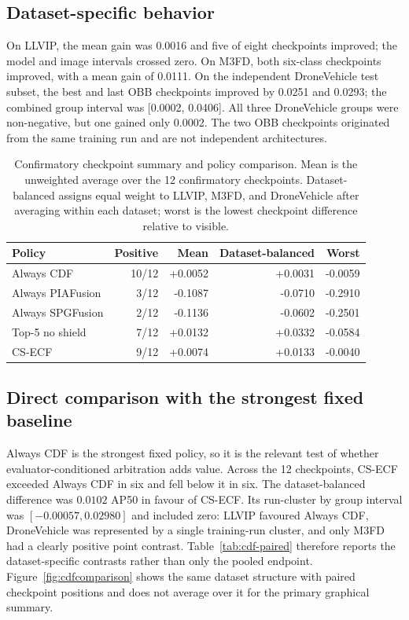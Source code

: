 \documentclass[preprint,11pt]{elsarticle}
\begin{document}
\subsection{Dataset-specific behavior}

On LLVIP, the mean gain was 0.0016 and five of eight checkpoints improved; the
model and image intervals crossed zero. On M3FD, both six-class checkpoints
improved, with a mean gain of 0.0111. On the independent DroneVehicle test
subset, the best and last OBB checkpoints improved by 0.0251 and 0.0293; the
combined group interval was [0.0002, 0.0406]. All three DroneVehicle groups were
non-negative, but one gained only 0.0002. The two OBB checkpoints originated
from the same training run and are not independent architectures.

\begin{table}[t]
\centering
\small
\caption{Confirmatory checkpoint summary and policy comparison. Mean is the
unweighted average over the 12 confirmatory checkpoints. Dataset-balanced
assigns equal weight to LLVIP, M3FD, and DroneVehicle after averaging within
each dataset; worst is the lowest checkpoint difference relative to visible.}
\label{tab:policy}
\begin{tabular}{@{}lrrrr@{}}
\toprule
Policy & Positive & Mean & Dataset-balanced & Worst \\
\midrule
Always CDF & 10/12 & +0.0052 & +0.0031 & -0.0059 \\
Always PIAFusion & 3/12 & -0.1087 & -0.0710 & -0.2910 \\
Always SPGFusion & 2/12 & -0.1136 & -0.0602 & -0.2501 \\
Top-5 no shield & 7/12 & +0.0132 & +0.0332 & -0.0584 \\
CS-ECF & 9/12 & +0.0074 & +0.0133 & -0.0040 \\
\bottomrule
\end{tabular}
\end{table}

\subsection{Direct comparison with the strongest fixed baseline}

Always CDF is the strongest fixed policy, so it is the relevant test of whether
evaluator-conditioned arbitration adds value. Across the 12 checkpoints, CS-ECF
exceeded Always CDF in six and fell below it in six. The dataset-balanced
difference was \(0.0102\) AP50 in favour of CS-ECF. Its run-cluster by group
interval was \([-0.00057,0.02980]\) and included zero: LLVIP favoured Always
CDF, DroneVehicle was represented by a single training-run cluster, and only
M3FD had a clearly positive point contrast. Table~\ref{tab:cdf-paired} therefore
reports the dataset-specific contrasts rather than only the pooled endpoint.
Figure~\ref{fig:cdfcomparison} shows the same dataset structure with paired
checkpoint positions and does not average over it for the primary graphical
summary.
\end{document}
